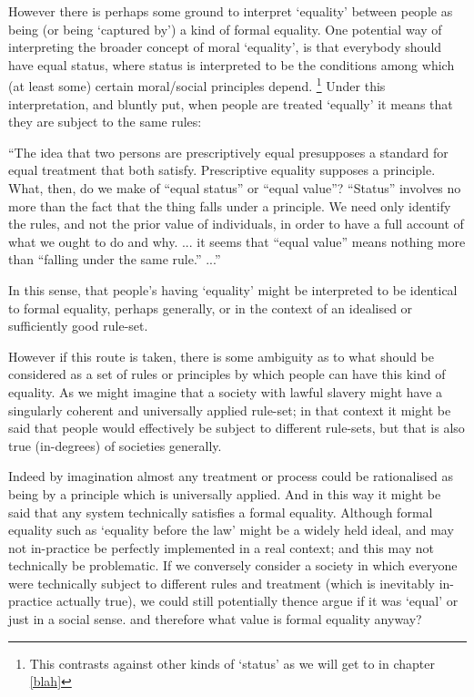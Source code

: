\documentclass{article}
\begin{document}
However there is perhaps some ground to interpret `equality' between people as being (or being `captured by') a kind of formal equality.
One potential way of interpreting the broader concept of moral `equality', is that everybody should have equal status, where status is interpreted to be the conditions among which (at least some) certain moral/social principles depend.
\footnote{This contrasts against other kinds of `status' as we will get to in chapter \ref{blah}}
Under this interpretation, and bluntly put, when people are treated `equally' it means that they are subject to the same rules:
\begin{displayquote}
``The idea that two persons are prescriptively equal presupposes a standard for equal treatment that both satisfy. Prescriptive equality supposes a principle. What, then, do we make of ``equal status'' or ``equal value''? ``Status'' involves no more than the fact that the thing falls under a principle. We need only identify the rules, and not the prior value of individuals, in order to have a full account of what we ought to do and why.
...
it seems that ``equal value'' means nothing more than ``falling under the same rule.'' ...''\cite{whatisbasicequalitynathan}
\end{displayquote}
In this sense, that people's having `equality' might be interpreted to be identical to formal equality, perhaps generally, or in the context of an idealised or sufficiently good rule-set.

However if this route is taken, there is some ambiguity as to what should be considered as a set of rules or principles by which people can have this kind of equality.
As we might imagine that a society with lawful slavery might have a singularly coherent and universally applied rule-set; in that context it might be said that people would effectively be subject to different rule-sets, but that is also true (in-degrees) of societies generally.

Indeed by imagination almost any treatment or process could be rationalised as being by a principle which is universally applied. And in this way it might be said that any system technically satisfies a formal equality.
Although formal equality such as  `equality before the law' might be a widely held ideal, and may not in-practice be perfectly implemented in a real context; and this may not technically be problematic. If we conversely consider a society in which everyone were technically subject to different rules and treatment (which is inevitably in-practice actually true), we could still potentially thence argue if it was `equal' or just in a social sense. and therefore what value is formal equality anyway?
\end{document}
